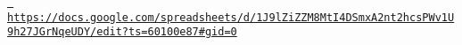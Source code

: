 \href{https://docs.google.com/spreadsheets/d/1J9lZiZZM8MtI4DSmxA2nt2hcsPWv1U9h27JGrNqeUDY/edit?ts=60100e87\#gid=0}{\texttt{ https\+://docs.\+google.\+com/spreadsheets/d/1\+J9l\+Zi\+ZZM8\+Mt\+I4\+DSmx\+A2nt2hcs\+PWv1\+U9h27\+JGr\+Nqe\+UDY/edit?ts=60100e87\#gid=0}} 